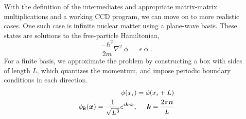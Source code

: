With the definition of the intermediates and appropriate matrix-matrix
multiplications and a working CCD program, we can move on to more
realistic cases. One such case is infinite nuclear matter using a
plane-wave basis. These states are solutions to the free-particle
Hamiltonian,
  \begin{equation}
  \frac{-\hbar^2}{2m}\nabla^2\mathop{\phi(\vec{x})}=\epsilon\mathop{\phi(\vec{x})}.
  \end{equation}
  For a finite basis, we approximate the problem by constructing a box
  with sides of length $L$, which quantizes the momentum, and impose
  periodic boundary conditions in each direction.
  \begin{align}
  \mathop{\phi(x_{i})}=\mathop{\phi(x_{i}+L)}
  \\ \mathop{\phi_{\vec{k}}(\vec{x})}=\frac{1}{\sqrt{L^{3}}}e^{i\vec{k}\cdot\vec{x}},\hspace{0.5cm}\vec{k}=\frac{2\pi\vec{n}}{L}
  \end{align}

